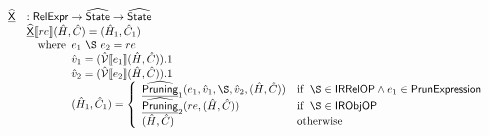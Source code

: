 \documentclass{article}
\newcommand{\lbr}{\ensuremath{\llbracket}}
\newcommand{\rbr}{\ensuremath{\rrbracket}}
\newcommand{\ifc}[1]{{\rm if}\begin{array}[t]{l}#1\end{array}}
\newcommand{\SF}[1]{\mbox{\textsf{#1}}}
\newcommand{\wherec}[1]{{\rm where}\begin{array}[t]{l}#1\end{array}}
\newcommand{\owc}{{\rm otherwise}}
\newcommand{\abs}[1]{\widehat{\SF{#1}}}
\newcommand{\aState}{\abs{State}}
\newcommand{\V}{\mathcal{V}}
\newcommand{\aV}{\hat{\mathcal{V}}}
\newcommand{\powerset}[1]{\wp(#1)}
\newcommand{\ahf}[1]{\widehat{\underline{\sf #1}}}
\newcommand{\rel}{\S}
\begin{document}
\[\begin{array}{lll}
\ahf{X} & : \SF{RelExpr} \rightarrow \aState \rightarrow \aState\\
& \ahf{X} \lbr re \rbr (\hat{H}, \hat{C}) = (\hat{H}_1, \hat{C}_1)\\
& \quad\wherec{
  e_1 ~ \rel ~ e_2 = re\\
  \hat{v}_1 = (\aV \lbr e_1 \rbr (\hat{H}, \hat{C})).1\\
  \hat{v}_2 = (\aV \lbr e_2 \rbr (\hat{H}, \hat{C})).1\\
  (\hat{H}_1, \hat{C}_1) = 
    \left\{ 
      \begin{array}{ll}
        \ahf {Pruning}_1 (e_1, \hat{v}_1, \rel, \hat{v}_2, (\hat{H}, \hat{C})) & 
          \ifc{\rel \in \SF{IRRelOP} \land e_1 \in \SF{PrunExpression}}\\
        \ahf {Pruning}_2 ( re, (\hat{H}, \hat{C})) & 
          \ifc{\rel \in \SF{IRObjOP}}\\
        (\hat{H}, \hat{C}) & \owc\\
      \end{array}
    \right.\\
}\\
\\\\
%

\end{array}\]
\end{document}
